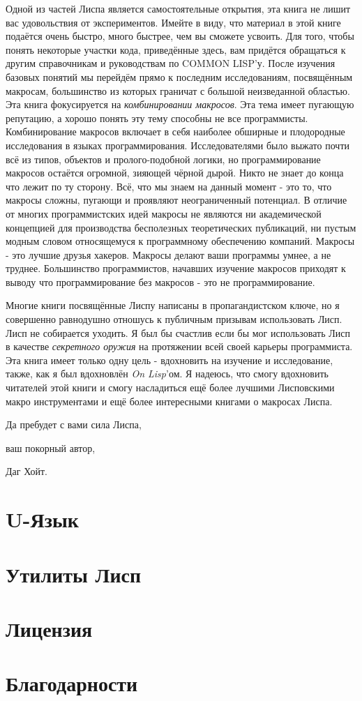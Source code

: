 Одной из частей Лиспа является самостоятельные открытия, эта книга не лишит вас удовольствия от экспериментов. Имейте в виду, что материал в этой книге подаётся очень быстро, много быстрее, чем вы сможете усвоить. Для того, чтобы понять некоторые участки кода, приведённые здесь, вам придётся обращаться к другим справочникам и руководствам по COMMON LISP'у. После изучения базовых понятий мы перейдём прямо к последним исследованиям, посвящённым макросам, большинство из которых граничат с большой неизведанной областью. Эта книга фокусируется на \emph{комбинировании макросов}. Эта тема имеет пугающую репутацию, а хорошо понять эту тему способны не все программисты. Комбинирование макросов включает в себя наиболее обширные и плодородные исследования в языках программирования. Исследователями было выжато почти всё из типов, объектов и пролого-подобной логики, но программирование макросов остаётся огромной, зияющей чёрной дырой. Никто не знает до конца что лежит по ту сторону. Всё, что мы знаем на данный момент - это то, что макросы сложны, пугающи и проявляют неограниченный потенциал. В отличие от многих программистских идей макросы не являются ни академической концепцией для производства бесполезных теоретических публикаций, ни пустым модным словом относящемуся к программному обеспечению компаний. Макросы - это лучшие друзья хакеров. Макросы делают ваши программы умнее, а не труднее. Большинство программистов, начавших изучение макросов приходят к выводу что программирование без макросов - это не программирование.

Многие книги посвящённые Лиспу написаны в пропагандистском ключе, но я совершенно равнодушно отношусь к публичным призывам использовать Лисп. Лисп не собирается уходить. Я был бы счастлив если бы мог использовать Лисп в качестве \emph{секретного оружия} на протяжении всей своей карьеры программиста. Эта книга имеет только одну цель - вдохновить на изучение и исследование, также, как я был вдохновлён \emph{On Lisp}'ом. Я надеюсь, что смогу вдохновить читателей этой книги и смогу насладиться ещё более лучшими Лисповскими макро инструментами и ещё более интересными книгами о макросах Лиспа.

Да пребудет с вами сила Лиспа,

ваш покорный автор,

Даг Хойт.
\section{U-Язык}\label{section_u_language}
\section{Утилиты Лисп}\label{section_the_lisp_utility}
\section{Лицензия}\label{section_license}
\section{Благодарности}\label{section_thanks}
